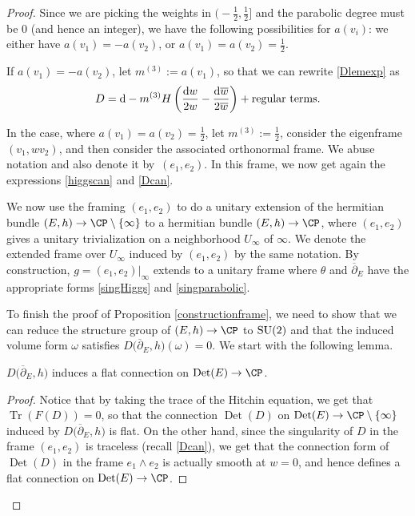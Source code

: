 \begin{proof}
Since we are picking the weights in $\bigl(-\frac12,\frac12\bigr]$ and the parabolic degree must be $0$ (and hence an integer), we have the following possibilities for $a(v_i)$: we either have $a(v_1)=-a(v_2)$, or $a(v_1)=a(v_2)=\frac12$.

If $a(v_1)=- a(v_2)$, let $m^{(3)}:=a(v_1)$, so that we can rewrite \eqref{Dlemexp} as
\begin{equation}\label{Dcan}
 D={\rm d}-m^{(3)}H\left(\frac{{\rm d}w}{2w}-\frac{{\rm d}\overline{w}}{2\overline{w}}\right) + \text{regular terms}.
\end{equation}

In the case, where $a(v_1)=a(v_2)=\frac12$, let $m^{(3)}:=\frac12$, consider the eigenframe $(v_1,wv_2)$, and then consider the associated orthonormal frame. We abuse notation and also denote it by~$(e_1,e_2)$. In this frame, we now get again the expressions \eqref{higgscan} and \eqref{Dcan}.

We now use the framing $(e_1,e_2)$ to do a unitary extension of the hermitian bundle $(E,h)\to \CP \setminus \{\infty\}$ to a hermitian bundle $(E,h)\to \CP$, where $(e_1,e_2)$ gives a unitary trivialization on a neighborhood $U_{\infty}$ of $\infty$. We denote the extended frame over $U_{\infty}$ induced by $(e_1,e_2)$ by the same notation. By construction, $g=(e_1,e_2)|_{\infty}$ extends to a unitary frame where $\theta$ and $\overline{\partial}_E$ have the appropriate forms \eqref{singHiggs} and \eqref{singparabolic}.

To finish the proof of Proposition \ref{constructionframe}, we need to show that we can reduce the structure group of $(E,h)\to \CP$ to ${\rm SU}(2)$ and that the induced volume form $\omega$ satisfies $D\bigl(\overline{\partial}_E,h\bigr)(\omega)=0$. We start with the following lemma.

\begin{Lemma} $D\bigl(\overline{\partial}_E,h\bigr)$ induces a flat connection on $\textnormal{Det}(E)\to \CP$.
\end{Lemma}

\begin{proof}Notice that by taking the trace of the Hitchin equation, we get that $\operatorname{Tr}(F(D))=0$, so that the connection $\operatorname{Det}(D)$ on $\operatorname{Det}(E)\to \CP \setminus \{\infty\}$ induced by $D\bigl(\overline{\partial}_E,h\bigr)$ is flat. On the other hand, since the singularity of $D$ in the frame $(e_1,e_2)$ is traceless (recall \eqref{Dcan}), we get that the connection form of $\operatorname{Det}(D)$ in the frame $e_1\wedge e_2$ is actually smooth at $w=0$, and hence defines a flat connection on $\operatorname{Det}(E)\to \CP$.
\end{proof}



\end{proof}
